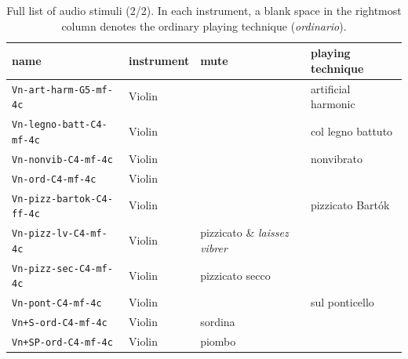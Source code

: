 \documentclass{bmcart}
\newcommand{\ipt}{IPT\xspace}
\newcommand{\ipts}{IPTs\xspace}
\newcommand{\nmu}{}
\begin{document}
\begin{backmatter}
\begin{table}
\caption{Full list of audio stimuli (2/2). In each instrument, a blank space in the rightmost column denotes the ordinary playing technique (\emph{ordinario}).}
\label{tab:list2}
\begin{tabular}{llll}
          name & instrument  & mute   &  playing technique \\ \hline \hline
          \texttt{Vn-art-harm-G5-mf-4c} & Violin & & artificial harmonic \\
          \texttt{Vn-legno-batt-C4-mf-4c} & Violin & & col legno battuto \\
          \texttt{Vn-nonvib-C4-mf-4c} & Violin & & nonvibrato \\
          \texttt{Vn-ord-C4-mf-4c} & Violin & & \\
          \texttt{Vn-pizz-bartok-C4-ff-4c} & Violin & & pizzicato Bart\'ok \\
          \texttt{Vn-pizz-lv-C4-mf-4c} & Violin & pizzicato \& \emph{laissez vibrer} \\
          \texttt{Vn-pizz-sec-C4-mf-4c} & Violin & pizzicato secco \\
          \texttt{Vn-pont-C4-mf-4c} & Violin & & sul ponticello \\
          \texttt{Vn+S-ord-C4-mf-4c} & Violin & sordina & \\
          \texttt{Vn+SP-ord-C4-mf-4c} & Violin & piombo & \\ \hline
\end{tabular}
\end{table}





\end{backmatter}
\end{document}
